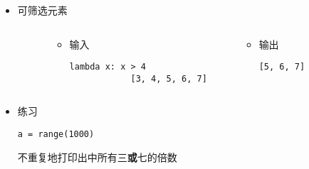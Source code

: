 \begin{frame} [fragile]
	\frametitle{}
	\begin{itemize}
	\item {}可筛选元素
	\begin{columns}
		\begin{column}[T]{.1\textwidth}
		\end{column}
		\begin{column}[T]{.4\textwidth}
			\begin{itemize}
			\item 输入
			\begin{lstlisting}[style=pythonstyle, gobble=12, texcl]
			lambda x: x > 4
			[3, 4, 5, 6, 7]
			\end{lstlisting}
			\end{itemize}
		\end{column}
		\begin{column}[T]{.4\textwidth}
			\begin{itemize}
			\item 输出
			\begin{lstlisting}[style=pythonstyle, gobble=12, texcl]
			[5, 6, 7]
			\end{lstlisting}
			\end{itemize}
		\end{column}
		\begin{column}[T]{.1\textwidth}
		\end{column}
	\end{columns}
	\item 练习
		\begin{lstlisting}[style=pythonstyle, gobble=8, texcl]
		a = range(1000)
		\end{lstlisting}
		不重复地打印出中所有三\textbf{或}七的倍数
	\end{itemize}
\end{frame}

